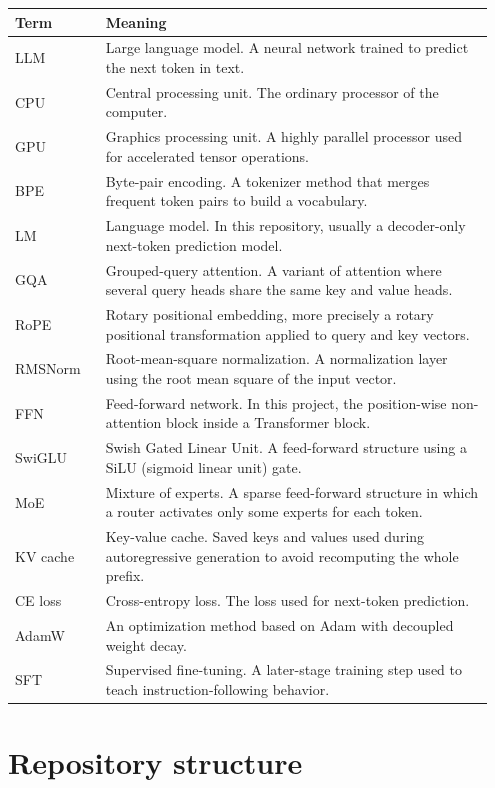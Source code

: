 \documentclass[11pt]{article}
\begin{document}
\begin{longtable}{p{0.18\linewidth} p{0.77\linewidth}}
\toprule
\textbf{Term} & \textbf{Meaning} \\
\midrule
LLM & Large language model. A neural network trained to predict the next token in text. \\
CPU & Central processing unit. The ordinary processor of the computer. \\
GPU & Graphics processing unit. A highly parallel processor used for accelerated tensor operations. \\
BPE & Byte-pair encoding. A tokenizer method that merges frequent token pairs to build a vocabulary. \\
LM & Language model. In this repository, usually a decoder-only next-token prediction model. \\
GQA & Grouped-query attention. A variant of attention where several query heads share the same key and value heads. \\
RoPE & Rotary positional embedding, more precisely a rotary positional transformation applied to query and key vectors. \\
RMSNorm & Root-mean-square normalization. A normalization layer using the root mean square of the input vector. \\
FFN & Feed-forward network. In this project, the position-wise non-attention block inside a Transformer block. \\
SwiGLU & Swish Gated Linear Unit. A feed-forward structure using a SiLU (sigmoid linear unit) gate. \\
MoE & Mixture of experts. A sparse feed-forward structure in which a router activates only some experts for each token. \\
KV cache & Key-value cache. Saved keys and values used during autoregressive generation to avoid recomputing the whole prefix. \\
CE loss & Cross-entropy loss. The loss used for next-token prediction. \\
AdamW & An optimization method based on Adam with decoupled weight decay. \\
SFT & Supervised fine-tuning. A later-stage training step used to teach instruction-following behavior. \\
\bottomrule
\end{longtable}

\section{Repository structure}
\end{document}
